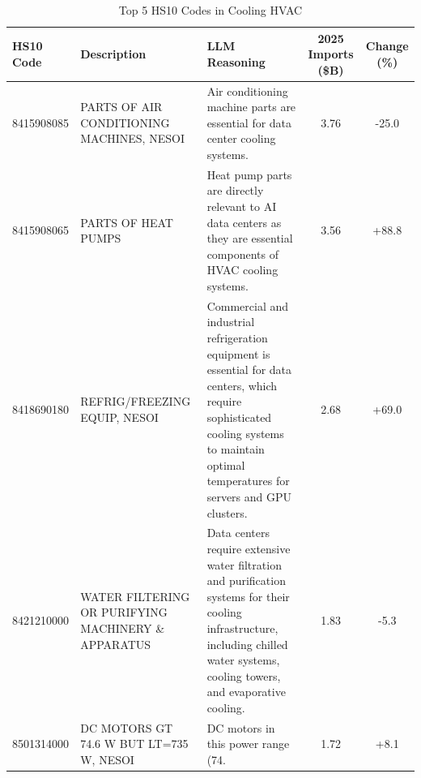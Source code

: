 \begin{table}[htbp]
\centering
\small
\caption{Top 5 HS10 Codes in Cooling HVAC}
\label{tab:top5_cooling_hvac}
\setlength{\tabcolsep}{1.25mm}
\renewcommand{\arraystretch}{1.80}
\begin{tabular}{lp{3.5cm}p{3.5cm}cc}
\toprule
HS10 Code & Description & LLM Reasoning & 2025 Imports (\$B) & Change (\%) \\
\midrule
8415908085 & {\footnotesize PARTS OF AIR CONDITIONING MACHINES, NESOI} & {\footnotesize Air conditioning machine parts are essential for data center cooling systems.} & 3.76 & -25.0 \\
8415908065 & {\footnotesize PARTS OF HEAT PUMPS} & {\footnotesize Heat pump parts are directly relevant to AI data centers as they are essential components of HVAC cooling systems.} & 3.56 & +88.8 \\
8418690180 & {\footnotesize REFRIG/FREEZING EQUIP, NESOI} & {\footnotesize Commercial and industrial refrigeration equipment is essential for data centers, which require sophisticated cooling systems to maintain optimal temperatures for servers and GPU clusters.} & 2.68 & +69.0 \\
8421210000 & {\footnotesize WATER FILTERING OR PURIFYING MACHINERY \& APPARATUS} & {\footnotesize Data centers require extensive water filtration and purification systems for their cooling infrastructure, including chilled water systems, cooling towers, and evaporative cooling.} & 1.83 & -5.3 \\
8501314000 & {\footnotesize DC  MOTORS GT 74.6 W BUT LT=735 W, NESOI} & {\footnotesize DC motors in this power range (74.} & 1.72 & +8.1 \\
\bottomrule
\end{tabular}
\end{table}

